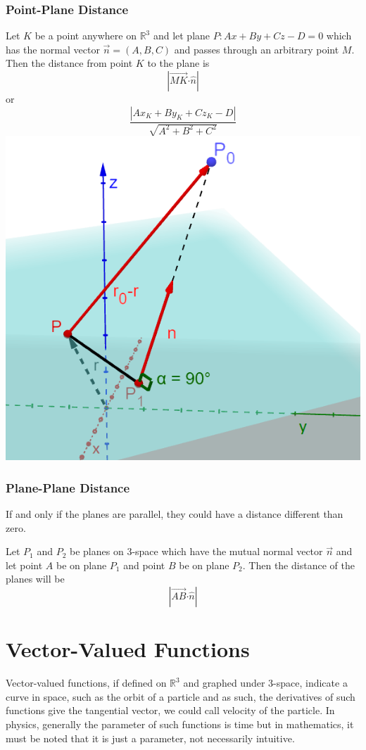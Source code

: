 \documentclass[12pt]{article}
\newcommand{\dotp}{{\boldsymbol \cdot}}
\begin{document}
\subsubsection{Point-Plane Distance}
Let $K$ be a point anywhere on $\mathbb{R}^3$ and let plane $P: Ax+By+Cz-D=0$ which has the normal vector $\vec n = (A,B,C)$ and passes through an arbitrary point $M$. Then the distance from point $K$ to the plane is $$|\vec{MK}\dotp \hat n|$$ or $$\dfrac{|Ax_K+By_K+Cz_K-D|}{\sqrt{A^2+B^2+C^2}}$$
\includegraphics[scale=0.7]{pointplane.png}

\subsubsection{Plane-Plane Distance}
If and only if the planes are parallel, they could have a distance different than zero. 

Let $P_1$ and $P_2$ be planes on 3-space which have the mutual normal vector $\vec n$ and let point $A$ be on plane $P_1$ and point $B$ be on plane $P_2$. Then the distance of the planes will be $$|\vec{AB} \dotp \hat n|$$
\section{Vector-Valued Functions}
Vector-valued functions, if defined on $\mathbb{R}^3$ and graphed under 3-space, indicate a curve in space, such as the orbit of a particle and as such, the derivatives of such functions give the tangential vector, we could call velocity of the particle. In physics, generally the parameter of such functions is time but in mathematics, it must be noted that it is just a parameter, not necessarily intuitive.
\end{document}
